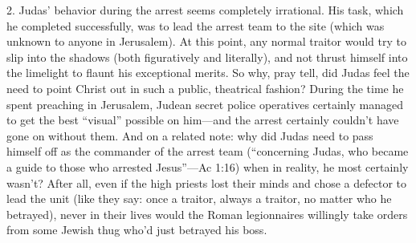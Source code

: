 2. Judas' behavior during the arrest seems completely irrational. His task, which he completed successfully, was to lead the arrest team to the site (which was unknown to anyone in Jerusalem). At this point, any normal traitor would try to slip into the shadows (both figuratively and literally), and not thrust himself into the limelight to flaunt his exceptional merits. So why, pray tell, did Judas feel the need to point Christ out in such a public, theatrical fashion? During the time he spent preaching in Jerusalem, Judean secret police operatives certainly managed to get the best ``visual'' possible on him---and the arrest certainly couldn't have gone on without them. And on a related note: why did Judas need to pass himself off as the commander of the arrest team (``concerning Judas, who became a guide to those who arrested Jesus''---Ac 1:16) when in reality, he most certainly wasn't? After all, even if the high priests lost their minds and chose a defector to lead the unit (like they say: once a traitor, always a traitor, no matter who he betrayed), never in their lives would the Roman legionnaires willingly take orders from some Jewish thug who'd just betrayed his boss.

